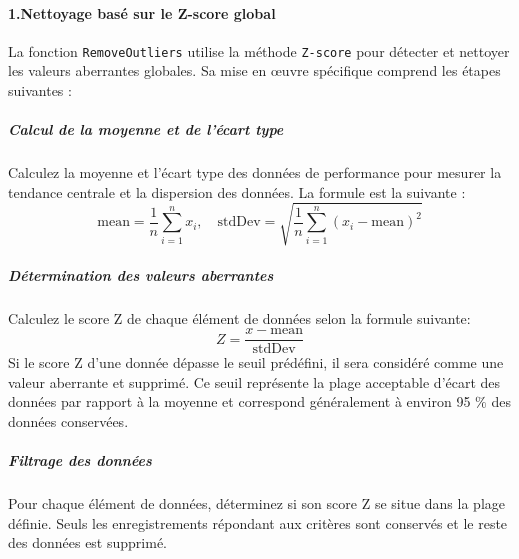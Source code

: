 \documentclass{rapportECL2024}
\begin{document}
\paragraph{1.Nettoyage basé sur le Z-score global}
La fonction \texttt{RemoveOutliers} utilise la méthode \texttt{Z-score} pour détecter et nettoyer les valeurs aberrantes globales. Sa mise en œuvre spécifique comprend les étapes suivantes :
\subparagraph{Calcul de la moyenne et de l'écart type}
Calculez la moyenne et l'écart type des données de performance pour mesurer la tendance centrale et la dispersion des données. La formule est la suivante :
\[
\text{mean} = \frac{1}{n} \sum_{i=1}^{n} x_i, \quad 
\text{stdDev} = \sqrt{\frac{1}{n} \sum_{i=1}^{n} (x_i - \text{mean})^2}
\]
\subparagraph{Détermination des valeurs aberrantes}
Calculez le score Z de chaque élément de données selon la formule suivante:
\[
Z = \frac{x - \text{mean}}{\text{stdDev}}
\]
Si le score Z d'une donnée dépasse le seuil prédéfini, il sera considéré comme une valeur aberrante et supprimé. Ce seuil représente la plage acceptable d'écart des données par rapport à la moyenne et correspond généralement à environ 95 $\%$ des données conservées.
\subparagraph{Filtrage des données}
Pour chaque élément de données, déterminez si son score Z se situe dans la plage définie. Seuls les enregistrements répondant aux critères sont conservés et le reste des données est supprimé.
\end{document}
